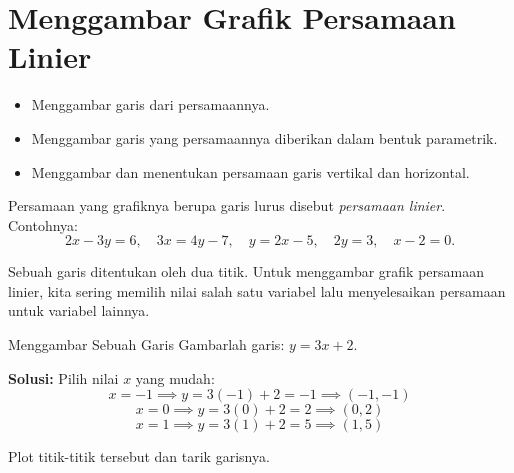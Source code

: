 \section{Menggambar Grafik Persamaan Linier}
\begin{outcome}
\begin{itemize}
\item Menggambar garis dari persamaannya.
\item Menggambar garis yang persamaannya diberikan dalam bentuk parametrik.
\item Menggambar dan menentukan persamaan garis vertikal dan horizontal.
\end{itemize}
\end{outcome}

Persamaan yang grafiknya berupa garis lurus disebut \emph{persamaan linier}. Contohnya:
\[
2x - 3y = 6,\quad 3x = 4y - 7,\quad y = 2x - 5,\quad 2y = 3,\quad x - 2 = 0.
\]

Sebuah garis ditentukan oleh dua titik. Untuk menggambar grafik persamaan linier, kita sering memilih nilai salah satu variabel lalu menyelesaikan persamaan untuk variabel lainnya.

\begin{example}{Menggambar Sebuah Garis}\label{exa:line-graph1}
Gambarlah garis: \(y = 3x + 2\).

\textbf{Solusi:} Pilih nilai $x$ yang mudah:
\[
x = -1 \implies y = 3(-1) + 2 = -1 \implies (-1,-1)
\]
\[
x = 0 \implies y = 3(0) + 2 = 2 \implies (0,2)
\]
\[
x = 1 \implies y = 3(1) + 2 = 5 \implies (1,5)
\]

Plot titik-titik tersebut dan tarik garisnya.
\begin{center}
\par{}\label{fig:equations-and-lines-new-tikz01}%

\end{center}
\end{example}

